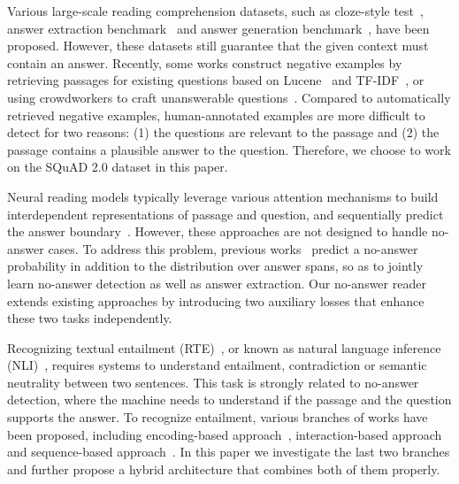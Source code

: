 \documentclass[letterpaper]{article} \usepackage{aaai19}  \usepackage{times}  \usepackage{helvet}  \usepackage{courier}  \usepackage{url}  \usepackage{graphicx}  \usepackage{pbox}
\begin{document}
Various large-scale reading comprehension datasets, such as cloze-style test~\cite{Hermann15}, answer extraction benchmark~\cite{Rajpurkar16,Joshi17} and answer generation benchmark~\cite{Nguyen16,Kovcisky18}, have been proposed.
However, these datasets still guarantee that the given context must contain an answer.
Recently, some works construct negative examples by retrieving passages for existing questions based on Lucene~\cite{tan2018know} and TF-IDF~\cite{Clark18}, or using crowdworkers to craft unanswerable questions~\cite{Rajpurkar18}.
Compared to automatically retrieved negative examples, human-annotated examples are more difficult to detect for two reasons: (1) the questions are relevant to the passage and (2) the passage contains a plausible answer to the question.
Therefore, we choose to work on the SQuAD 2.0 dataset in this paper.


Neural reading models typically leverage various attention mechanisms to build interdependent representations of passage and question, and sequentially predict the answer boundary~\cite{Seo17,Hu17,Wang17b,Yu18,Hu18}.
However, these approaches are not designed to handle no-answer cases.
To address this problem, previous works~\cite{Levy17,Clark18,kundu2018nil} predict a no-answer probability in addition to the distribution over answer spans, so as to jointly learn no-answer detection as well as answer extraction.
Our no-answer reader extends existing approaches by introducing two auxiliary losses that enhance these two tasks independently.

Recognizing textual entailment (RTE)~\cite{dagan2010recognizing,Marelli14}, or known as natural language inference (NLI)~\cite{Bowman15}, requires systems to understand entailment, contradiction or semantic neutrality between two sentences.
This task is strongly related to no-answer detection, where the machine needs to understand if the passage and the question supports the answer.
To recognize entailment, various branches of works have been proposed, including encoding-based approach~\cite{bowman2016fast,mou2015natural}, interaction-based approach~\cite{Parikh16,chen2016enhanced} and sequence-based approach~\cite{Radford18}.
In this paper we investigate the last two branches and further propose a hybrid architecture that combines both of them properly.
\end{document}
